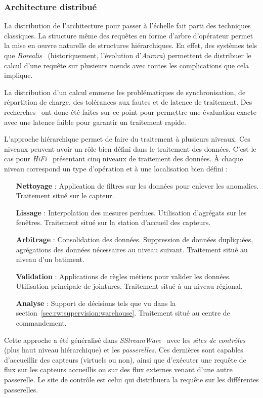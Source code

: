 \subsubsection{Architecture distribué}
La distribution de l'architecture pour passer à l'échelle fait parti des techniques classiques. La structure même des requêtes en forme d'arbre d'opérateur permet la mise en œuvre naturelle de structures hiérarchiques. En effet, des systèmes tels que \textit{Borealis}~\cite{Abadi:borealis} (historiquement, l'évolution d'\textit{Aurora}) permettent de distribuer le calcul d'une requête sur plusieurs nœuds avec toutes les complications que cela implique.

La distribution d'un calcul emmene les problématiques de synchronisation, de répartition de charge, des tolérances aux fautes et de latence de traitement. Des recherches~\cite{Hwang:distributed, Tucker:heartbeat} ont donc été faites sur ce point pour permettre une évaluation exacte avec une latence faible pour garantir un traitement rapide.

L'approche hiérarchique permet de faire du traitement à plusieurs niveaux. Ces niveaux peuvent avoir un rôle bien défini dans le traitement des données. C'est le cas pour \textit{HiFi}~\cite{Franklin:hifi} présentant cinq niveaux de traitement des données. À chaque niveau correspond un type d'opération et à une localisation bien défini :
\begin{itemize}
	\item[\textbf{Nettoyage} :] Application de filtres sur les données pour enlever les anomalies. Traitement situé sur le capteur.
	\item[\textbf{Lissage} :] Interpolation des mesures perdues. Utilisation d'agrégats sur les fenêtres. Traitement situé sur la station d'accueil des capteurs.
	\item[\textbf{Arbitrage} :] Consolidation des données. Suppression de données dupliquées, agrégations des données nécessaires au niveau suivant. Traitement situé au niveau d'un batiment.
	\item[\textbf{Validation} :] Applications de règles métiers pour valider les données. Utilisation principale de jointures. Traitement situé à un niveau régional.
	\item[\textbf{Analyse} :] Support de décisions tels que vu dans la section~\ref{sec:rw:supervision:warehouse}. Traitement situé au centre de commandement.
\end{itemize}

Cette approche a été généralisé dans \textit{SStreamWare}~\cite{Gurgen:sstreamware} avec les \textit{sites de contrôles} (plus haut niveau hiérarchique) et les \textit{passerelles}. Ces dernières sont capables d'accueillir des capteurs (virtuels ou non), ainsi que d'exécuter une requête de flux sur les capteurs accueillis ou sur des flux externes venant d'une autre passerelle. Le site de contrôle est celui qui distribuera la requête sur les différentes passerelles.

